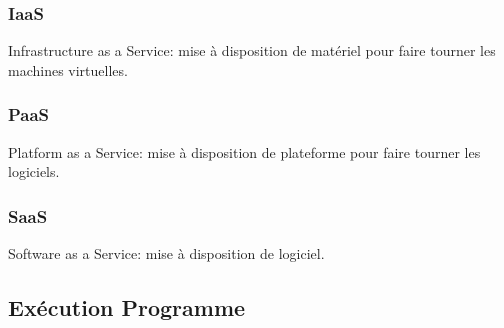 \documentclass{article}
\begin{document}
\subsubsection{IaaS}
\begin{definition}
    Infrastructure as a Service: mise à disposition de matériel pour faire tourner les machines virtuelles.
\end{definition}

\subsubsection{PaaS}
\begin{definition}
    Platform as a Service: mise à disposition de plateforme pour faire tourner les logiciels.
\end{definition}

\subsubsection{SaaS}
\begin{definition}
    Software as a Service: mise à disposition de logiciel.
\end{definition}


\subsection{Exécution Programme}
\end{document}
